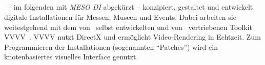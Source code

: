 \subsection{\mesodi}
\label{sec:em_meso_digital_initeriors}

\mesodi~-- im folgenden mit \emph{MESO DI} abgekürzt -- konzipiert, gestaltet
und entwickelt digitale Installationen für Messen, Museen und Events.  Dabei
arbeiten sie weitestgehend mit dem von \meso~selbst entwickelten und von
\mesois~vertriebenen Toolkit VVVV~\cite{v4}.  VVVV nutzt DirectX und ermöglicht
Video-Rendering in Echtzeit.  Zum Programmieren der Installationen (sogenannten
\enquote{Patches}) wird ein knotenbasiertes visuelles Interface genutzt.

